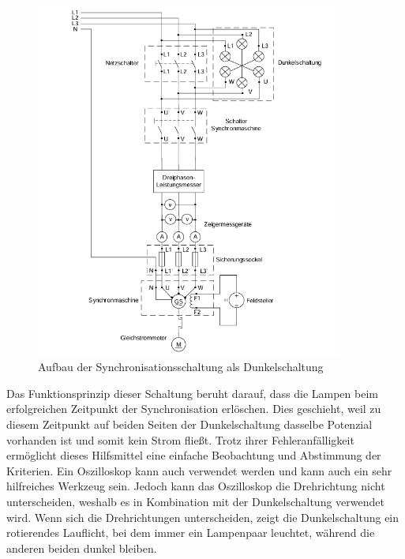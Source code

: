 \documentclass{report}
\begin{document}
\begin{figure}[!ht]
	\centering
	\includegraphics[width=0.9\textwidth]{./assets/img/dunkelschaltung_aufbau.png}
	\caption{Aufbau der Synchronisationsschaltung als Dunkelschaltung}
	\label{fig:dunkelschaltung_aufbau}
\end{figure}

Das Funktionsprinzip dieser Schaltung beruht darauf, dass die Lampen beim erfolgreichen Zeitpunkt der Synchronisation erlöschen. Dies geschieht, weil zu diesem Zeitpunkt auf beiden Seiten der Dunkelschaltung dasselbe Potenzial vorhanden ist und somit kein Strom fließt. Trotz ihrer Fehleranfälligkeit ermöglicht dieses Hilfsmittel eine einfache Beobachtung und Abstimmung der Kriterien. Ein Oszilloskop kann auch verwendet werden und kann auch ein sehr hilfreiches Werkzeug sein. Jedoch kann das Oszilloskop die Drehrichtung nicht unterscheiden, weshalb es in Kombination mit der Dunkelschaltung verwendet wird. Wenn sich die Drehrichtungen unterscheiden, zeigt die Dunkelschaltung ein rotierendes Lauflicht, bei dem immer ein Lampenpaar leuchtet, während die anderen beiden dunkel bleiben.
\end{document}
